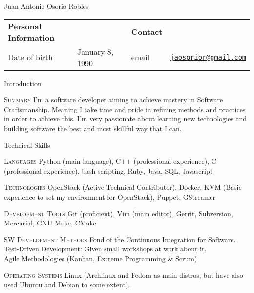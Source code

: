 \documentclass[english,10pt,letterpaper]{article}
\begin{document}
\centering
\begin{cv}{Juan Antonio Osorio-Robles}

	\begin{table}[h]
		\begin{tabular}{@{} l l p{0.5cm} l r}
			{\bf Personal Information}	&	&	&	{\bf Contact}	&\\
			Date of birth &	January 8, 1990	&	&
			email & \href{mailto:jaosorior@gmail.com}{\tt jaosorior@gmail.com}\\
		\end{tabular}
	\end{table}

	\begin{cvlist}{Introduction}
        \item[\textsc{Summary}]
            I'm a software developer aiming to achieve mastery in Software
            Craftsmanship. Meaning I take time and pride in refining
            methods and practices in order to achieve this. I'm very passionate
            about learning new technologies and building software the best and
            most skillful way that I can.
	\end{cvlist}


	\begin{cvlist}{Technical Skills}
			\item [\textsc{Languages}]
                Python (main language), C++ (professional experience), C
                (professional experience), bash scripting, Ruby, Java, SQL,
                Javascript
			\item [\textsc{Technologies}]
                OpenStack (Active Technical Contributor), Docker,
                KVM (Basic experience to set my environment for OpenStack),
                Puppet, GStreamer
			\item [\textsc{Development Tools}]
                Git (proficient), Vim (main editor), Gerrit, Subversion,
                Mercurial, GNU Make, CMake
			\item [\textsc{SW Development Methods}]
				Fond of the Continuous Integration for Software.\\
                Test-Driven Development: Given small workshops at work about
                it.\\
                Agile Methodologies (Kanban, Extreme Programming \& Scrum)
			\item [\textsc{Operating Systems}]
                Linux (Archlinux and Fedora as main distros, but have also
                used Ubuntu and Debian to some extent).
	\end{cvlist}


\end{cv}
\end{document}
